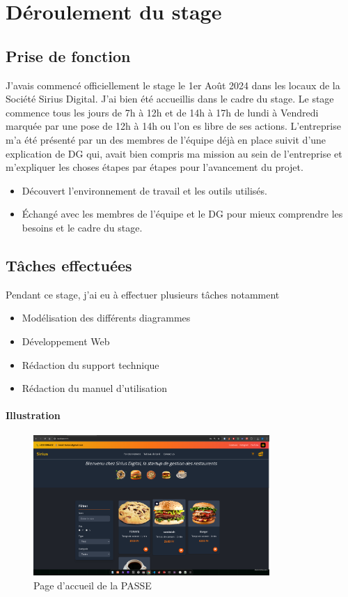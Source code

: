 \chapter{Déroulement du stage}
\clearpage


\section{Prise de fonction}
J'avais commencé officiellement le stage le 1er Août 2024 dans les locaux de la Société Sirius Digital. J'ai bien été accueillis dans le cadre du stage. 
Le stage commence tous les jours de 7h à 12h et de 14h à 17h de lundi à Vendredi marquée par une pose de 12h à 14h ou l'on es libre de ses actions.
L'entreprise m'a été présenté par un des membres de l'équipe déjà en place suivit d'une explication de DG qui, avait bien compris ma mission au sein de l'entreprise et m'expliquer les choses étapes par étapes pour l'avancement du projet.


\begin{itemize}
    \item Découvert l'environnement de travail et les outils utilisés.
    \item Échangé avec les membres de l'équipe et le DG pour mieux comprendre les besoins et le cadre du stage.

\end{itemize}
\section{Tâches effectuées}
Pendant ce stage, j'ai eu à effectuer plusieurs tâches notamment
\begin{itemize}
    \item Modélisation des différents diagrammes
    \item Développement Web
    \item Rédaction du support technique
    \item Rédaction du manuel d'utilisation    
\end{itemize} 


\subsubsection{Illustration}
\begin{figure}[H]
    \centering
    \includegraphics[width=0.8\textwidth]{images/passe/home.png}
    \caption{Page d'accueil de la \ac{PASSE}}
    \label{fig:page-accueil_pass}
\end{figure}

